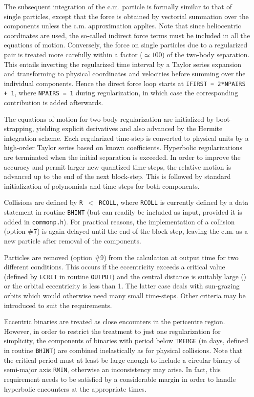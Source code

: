 \documentclass[12pt]{article}
\begin{document}
The subsequent integration of the c.m. particle is formally similar to that
of single particles, except that the force is obtained by vectorial
summation over the components unless the c.m. approximation applies.
Note that since heliocentric coordinates are used, the so-called indirect
force terms must be included in all the equations of motion.
Conversely, the force on single particles due to a regularized pair is
treated more carefully within a factor ($\simeq 100$) of the two-body
separation.
This entails inverting the regularized time interval by a Taylor series
expansion and transforming to physical coordinates and velocities before
summing over the individual components.
Hence the direct force loop starts at {\tt IFIRST = 2*NPAIRS + 1},
where {\tt NPAIRS = 1} during regularization, in which case the
corresponding contribution is added afterwards.

The equations of motion for two-body regularization are initialized by
boot-strapping, yielding explicit derivatives and also advanced by
the Hermite integration scheme.
Each regularized time-step is converted to physical units by a high-order
Taylor series based on known coefficients.
Hyperbolic regularizations are terminated when the initial separation is
exceeded.
In order to improve the accuracy and permit larger new quantized time-steps,
the relative motion is advanced up to the end of the next block-step.
This is followed by standard initialization of polynomials and time-steps
for both components.

Collisions are defined by {\tt R $<$ RCOLL}, where {\tt RCOLL} is currently
defined by a data statement in routine {\tt BHINT} (but can readily be
included as input, provided it is added in {\tt commonp.h}).
For practical reasons, the implementation of a collision (option \#7) is
again delayed until the end of the block-step, leaving the c.m. as a new
particle after removal of the components.

Particles are removed (option \#9) from the calculation at output time for
two different conditions.
This occurs if the eccentricity exceeds a critical value (defined by
{\tt ECRIT} in routine {\tt OUTPUT}) and the central distance is suitably
large () or the orbital eccentricity is less than 1.
The latter case deals with sun-grazing orbits which would otherwise need
many small time-steps.
Other criteria may be introduced to suit the requirements.

Eccentric binaries are treated as close encounters in the pericentre region.
However, in order to restrict the treatment to just one regularization for
simplicity, the components of binaries with period below {\tt TMERGE}
(in days, defined in routine {\tt BHINT}) are combined inelastically as
for physical collisions.
Note that the critical period must at least be large enough to include a
circular binary of semi-major axis {\tt RMIN}, otherwise an inconsistency
may arise.
In fact, this requirement needs to be satisfied by a considerable margin
in order to handle hyperbolic encounters at the appropriate times.
\end{document}
